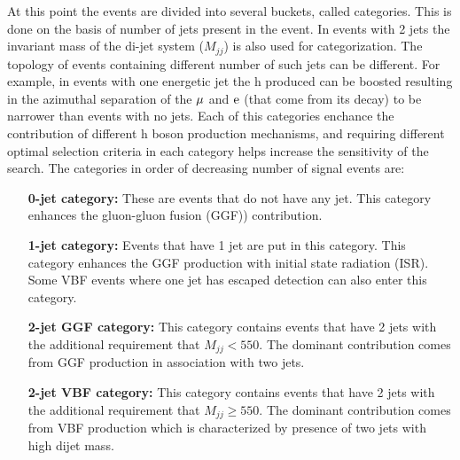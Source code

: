 At this point the events are divided into several buckets, called categories. This is done on the basis of number of jets present in the event. In events with 2 jets the invariant mass of the di-jet system ($M_{jj}$) is also used for categorization. The topology of events containing different number of such jets can be different. For example, in events with one energetic jet the h produced can be boosted resulting in the azimuthal separation of the $\mu$ and $\text{e}$ (that come from its decay) to be narrower than events with no jets. Each of this categories enchance the contribution of different h boson production mechanisms, and requiring different optimal selection criteria in each category  helps increase the sensitivity of the search. The categories in order of decreasing number of signal events are:
\begin{itemize}
\item[{\bf 0-jet category:}] These are events that do not have any jet. This category enhances the gluon-gluon fusion (GGF)) contribution.
\item[{\bf 1-jet category:}] Events that have 1 jet are put in this category. This category enhances the GGF production with initial state radiation (ISR). Some VBF events where one jet has escaped detection can also enter this category.
\item[{\bf 2-jet GGF category:}] This category contains events that have 2 jets with the additional requirement that $M_{jj}<550$\GeV. The dominant contribution comes from GGF production in association with two jets.
\item[{\bf 2-jet VBF category:}] This category contains events that have 2 jets with the additional requirement that $M_{jj}\geq 550$\GeV. The dominant contribution comes from VBF production which is characterized by presence of two jets with high dijet mass.  
\end{itemize}

